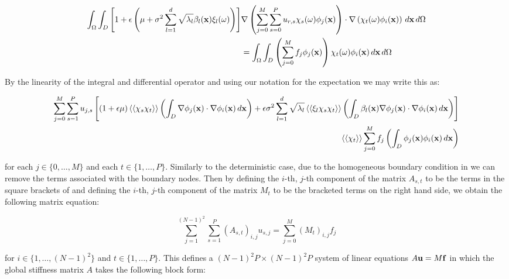 \begin{align}
  \begin{split}
    \int_\Omega\int_D
    \left[1 + \epsilon\left(\mu +
  \sigma^2\sum_{l=1}^d\sqrt{\lambda_l}\beta_l(\mathbf{x})\xi_l(\omega)\right)\right]
      &\nabla\left(\sum_{j=0}^M\sum_{s=0}^Pu_{r,s}\chi_s(\omega)\phi_j(\mathbf{x})\right)
      \cdot\nabla\left(\chi_t(\omega)\phi_i(\mathbf{x})\right)\, d\mathbf{x}\, d\Omega \\
      &= \int_\Omega\int_D\left(\sum_{j=0}^Mf_j\phi_j(\mathbf{x})\right)
        \chi_t(\omega)\phi_i(\mathbf{x})\, d\mathbf{x}\, d\Omega
  \end{split}
\end{align}

By the linearity of the integral and differential operator and using our
notation for the expectation  we may
write this as:

\begin{align}\label{eq:twod-stochastic-discrete}
  \begin{split}
      \sum_{j=0}^M\sum_{s=1}^Pu_{j,s}\left[(1 + \epsilon\mu)\left\langle\langle\chi_s\chi_t\right\rangle\rangle
      \left(\int_D\nabla\phi_j(\mathbf{x})\cdot\nabla\phi_i(\mathbf{x})\, d\mathbf{x}\right) +
      \epsilon\sigma^2\sum_{l=1}^d\sqrt{\lambda_l}\left\langle\langle\xi_l\chi_s\chi_t\right\rangle\rangle
      \left(\int_D\beta_l(\mathbf{x})\nabla\phi_j(\mathbf{x})\cdot\nabla\phi_i(\mathbf{x})\, d\mathbf{x}\right)\right] \\
      \left\langle\langle\chi_t\right\rangle\rangle\sum_{j=0}^Mf_j\left(\int_D\phi_j(\mathbf{x})\phi_i(\mathbf{x})\, d\mathbf{x}\right)
  \end{split}
\end{align}

for each $j \in \{0,\ldots,M\}$ and each $t \in \{1, \ldots, P\}$. Similarly to
the deterministic case, due to the homogeneous boundary condition in
 we can remove the terms associated with the boundary
nodes. Then by defining the $i$-th, $j$-th component of the matrix $A_{s,t}$ to
be the terms in the square brackets of  and
defining the $i$-th, $j$-th component of the matrix $M_t$ to be the bracketed
terms on the right hand side, we obtain the following matrix equation:

\begin{equation}
    \sum_{j=1}^{(N-1)^2}\sum_{s=1}^P(A_{s,t})_{i,j}u_{s,j} =
    \sum_{j=0}^M(M_t)_{i,j}f_j
\end{equation}

for $i \in \{1, \ldots, (N-1)^2\}$ and $t \in \{1,\ldots,P\}$. This defines a
$(N-1)^2P \times (N-1)^2P$ system of linear equations $A\mathbf{u} = M\mathbf{f}$ in
which the global stiffness matrix $A$ takes the following block form:

